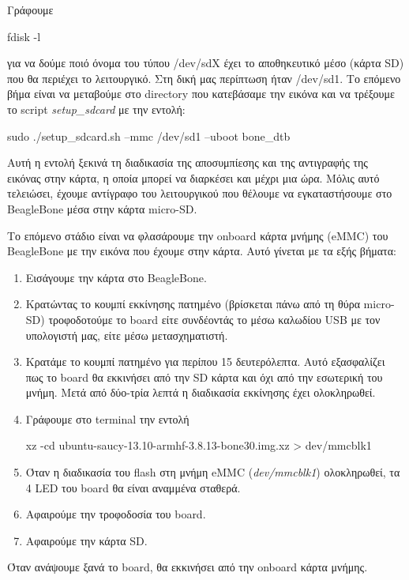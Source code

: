 \documentclass[12pt, a4paper, oneside]{report}
\begin{document}
Γράφουμε
\begin{code}
fdisk -l
\end{code}
για να δούμε ποιό όνομα του τύπου \slash dev\slash sdX έχει το αποθηκευτικό μέσο (κάρτα SD) που θα περιέχει το λειτουργικό. Στη δική μας περίπτωση ήταν \slash dev\slash sd1. Το επόμενο βήμα είναι να μεταβούμε στο directory που κατεβάσαμε την εικόνα και να τρέξουμε το script \emph{setup\_sdcard} με την εντολή:
\begin{code}
sudo ./setup_sdcard.sh --mmc /dev/sd1 --uboot bone_dtb
\end{code}
Αυτή η εντολή ξεκινά τη διαδικασία της αποσυμπίεσης και της αντιγραφής της εικόνας στην κάρτα, η οποία μπορεί να διαρκέσει και μέχρι μια ώρα. Μόλις αυτό τελειώσει, έχουμε αντίγραφο του λειτουργικού που θέλουμε να εγκαταστήσουμε στο BeagleBone μέσα στην κάρτα micro-SD.

Το επόμενο στάδιο είναι να φλασάρουμε την onboard κάρτα μνήμης (eMMC) του BeagleBone με την εικόνα που έχουμε στην κάρτα. Αυτό γίνεται με τα εξής βήματα:
\begin{enumerate}
\item Εισάγουμε την κάρτα στο BeagleBone. 
\item Κρατώντας το κουμπί εκκίνησης πατημένο (βρίσκεται πάνω από τη θύρα micro-SD) τροφοδοτούμε το board είτε συνδέοντάς το μέσω καλωδίου USB με τον υπολογιστή μας, είτε μέσω μετασχηματιστή. 
\item Κρατάμε το κουμπί πατημένο για περίπου 15 δευτερόλεπτα. Αυτό εξασφαλίζει πως το board θα εκκινήσει από την SD κάρτα και όχι από την εσωτερική του μνήμη. Μετά από δύο-τρία λεπτά η διαδικασία εκκίνησης έχει ολοκληρωθεί.
\item Γράφουμε στο terminal την εντολή 
\begin{code}
xz -cd ubuntu-saucy-13.10-armhf-3.8.13-bone30.img.xz > dev/mmcblk1
\end{code}
\item Όταν η διαδικασία του flash στη μνήμη eMMC (\emph{dev/mmcblk1}) ολοκληρωθεί, τα 4 LED του board θα είναι αναμμένα σταθερά.
\item Αφαιρούμε την τροφοδοσία του board.
\item Αφαιρούμε την κάρτα SD.
\end{enumerate}
Όταν ανάψουμε ξανά το board, θα εκκινήσει από την onboard κάρτα μνήμης.

\end{document}
